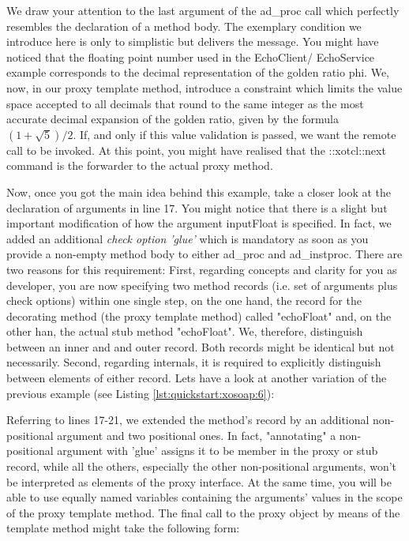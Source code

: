 We draw your attention to the last argument of the ad\_proc call which perfectly resembles the 
declaration of a method body. The exemplary condition we introduce here is only to simplistic but 
delivers the message. You might have noticed that the floating point number used in the EchoClient/
EchoService example corresponds to the decimal representation of the golden ratio phi. We, now, in our 
proxy template method, introduce a constraint which limits the value space accepted to all decimals that 
round to the same integer as the most accurate decimal expansion of the golden ratio, given by the 
formula \begin{math} (1 + \sqrt{5}) / 2\end{math}. If, and only if this value validation is passed, we want 
the remote call to be invoked. At this point, you might have realised that the ::xotcl::next command is the 
forwarder to the actual proxy method. 

Now, once you got the main idea behind this example, take a closer look  at the declaration of 
arguments in line 17. You might notice that there is a slight but important modification of how the 
argument inputFloat is specified. In fact, we added an additional \emph{check option 'glue'} which is 
mandatory as soon as you provide a non-empty method body to either ad\_proc and ad\_instproc. There 
are two reasons for this requirement: First, regarding concepts and clarity for you as developer, you are 
now specifying two method records (i.e. set of arguments plus check options)  within one single step, on 
the one hand, the record for the decorating method (the proxy template method) called "echoFloat" and, 
on the other han, the actual stub method "echoFloat". We, therefore, distinguish between an inner and 
and outer record. Both records might be identical but not necessarily. Second, regarding internals, it is 
required to explicitly distinguish between elements of either record. Lets have a look at another variation 
of the previous example (see Listing \ref{lst:quickstart:xosoap:6}):



Referring to lines 17-21, we extended the method's record by an additional non-positional argument and 
two positional ones. In fact, "annotating" a non-positional argument with 'glue' assigns it to be member in 
the proxy or stub record, while all the others, especially the other non-positional arguments, won't be 
interpreted as elements of the proxy interface. At the same time, you will be able to use equally named 
variables containing the arguments' values in the scope of the proxy template method. The final call to 
the proxy object by means of the template method might take the following form:

